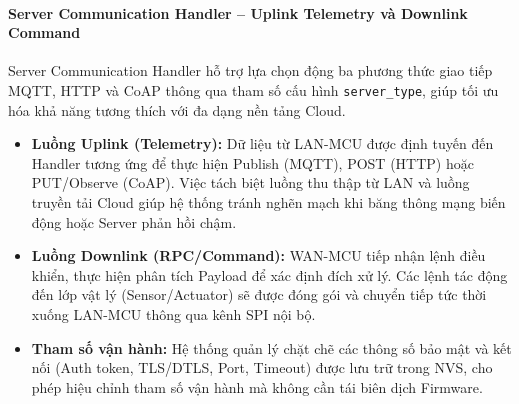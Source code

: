         \paragraph{Server Communication Handler -- Uplink Telemetry và Downlink Command}
        Server Communication Handler hỗ trợ lựa chọn động ba phương thức giao tiếp MQTT, HTTP và CoAP thông qua tham số cấu hình \texttt{server\_type}, giúp tối ưu hóa khả năng tương thích với đa dạng nền tảng Cloud.
        
        \begin{itemize}
            \item \textbf{Luồng Uplink (Telemetry):} Dữ liệu từ LAN-MCU được định tuyến đến Handler tương ứng để thực hiện Publish (MQTT), POST (HTTP) hoặc PUT/Observe (CoAP). Việc tách biệt luồng thu thập từ LAN và luồng truyền tải Cloud giúp hệ thống tránh nghẽn mạch khi băng thông mạng biến động hoặc Server phản hồi chậm.
        
            \item \textbf{Luồng Downlink (RPC/Command):} WAN-MCU tiếp nhận lệnh điều khiển, thực hiện phân tích Payload để xác định đích xử lý. Các lệnh tác động đến lớp vật lý (Sensor/Actuator) sẽ được đóng gói và chuyển tiếp tức thời xuống LAN-MCU thông qua kênh SPI nội bộ.
        
            \item \textbf{Tham số vận hành:} Hệ thống quản lý chặt chẽ các thông số bảo mật và kết nối (Auth token, TLS/DTLS, Port, Timeout) được lưu trữ trong NVS, cho phép hiệu chỉnh tham số vận hành mà không cần tái biên dịch Firmware.
        \end{itemize}
        
        
        

